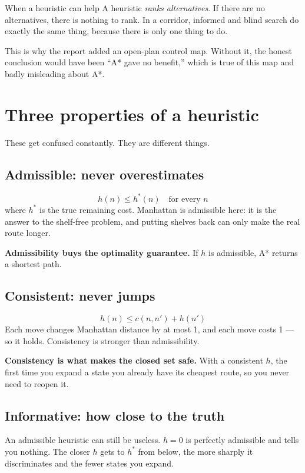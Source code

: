 \documentclass[11pt,a4paper]{article}
\begin{document}
\begin{keyidea}{When a heuristic can help}
A heuristic \emph{ranks alternatives}. If there are no alternatives, there is
nothing to rank. In a corridor, informed and blind search do exactly the same
thing, because there is only one thing to do.
\end{keyidea}

This is why the report added an open-plan control map. Without it, the honest
conclusion would have been ``A* gave no benefit,'' which is true of this map and
badly misleading about A*.

\section{Three properties of a heuristic}

These get confused constantly. They are different things.

\subsection{Admissible: never overestimates}
\[
  h(n) \leq h^*(n) \quad\text{for every } n
\]
where $h^*$ is the true remaining cost. Manhattan is admissible here: it is the
answer to the shelf-free problem, and putting shelves back can only make the real
route longer.

\textbf{Admissibility buys the optimality guarantee.} If $h$ is admissible, A*
returns a shortest path.

\subsection{Consistent: never jumps}
\[
  h(n) \leq c(n, n') + h(n')
\]
Each move changes Manhattan distance by at most 1, and each move costs 1 --- so
it holds. Consistency is stronger than admissibility.

\textbf{Consistency is what makes the closed set safe.} With a consistent $h$,
the first time you expand a state you already have its cheapest route, so you
never need to reopen it.

\subsection{Informative: how close to the truth}

An admissible heuristic can still be useless. $h = 0$ is perfectly admissible and
tells you nothing. The closer $h$ gets to $h^*$ from below, the more sharply it
discriminates and the fewer states you expand.
\end{document}
